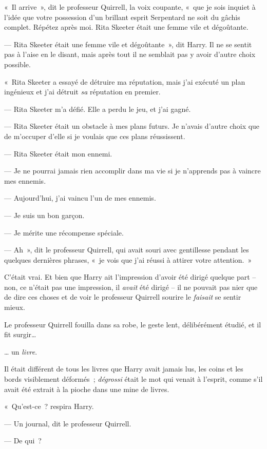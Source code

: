 «~Il arrive~», dit le professeur Quirrell, la voix coupante, «~que je sois inquiet à l'idée que votre possession d'un brillant esprit Serpentard ne soit du gâchis complet. Répétez après moi. Rita Skeeter était une femme vile et dégoûtante.

--- Rita Skeeter était une femme vile et dégoûtante~», dit Harry. Il ne se sentit pas à l'aise en le disant, mais après tout il ne semblait pas y avoir d'autre choix possible.

«~Rita Skeeter a essayé de détruire ma réputation, mais j'ai exécuté un plan ingénieux et j'ai détruit \emph{sa} réputation en premier.

--- Rita Skeeter m'a défié. Elle a perdu le jeu, et j'ai gagné.

--- Rita Skeeter était un obstacle à mes plans futurs. Je n'avais d'autre choix que de m'occuper d'elle si je voulais que ces plans réussissent.

--- Rita Skeeter était mon ennemi.

--- Je ne pourrai jamais rien accomplir dans ma vie si je n'apprends pas à vaincre mes ennemis.

--- Aujourd'hui, j'ai vaincu l'un de mes ennemis.

--- Je suis un bon garçon.

--- Je mérite une récompense spéciale.

--- Ah~», dit le professeur Quirrell, qui avait souri avec gentillesse pendant les quelques dernières phrases, «~je vois que j'ai réussi à attirer votre attention.~»

C'était vrai. Et bien que Harry ait l'impression d'avoir été dirigé quelque part -- non, ce n'était pas une impression, il \emph{avait} été dirigé -- il ne pouvait pas nier que de dire ces choses et de voir le professeur Quirrell sourire le \emph{faisait} se sentir mieux.

Le professeur Quirrell fouilla dans sa robe, le geste lent, délibérément étudié, et il fit surgir…

… un \emph{livre}.

Il était différent de tous les livres que Harry avait jamais lus, les coins et les bords visiblement déformés~; \emph{dégrossi} était le mot qui venait à l'esprit, comme s'il avait été extrait à la pioche dans une mine de livres.

«~Qu'est-ce~? respira Harry.

--- Un journal, dit le professeur Quirrell.

--- De qui~?

